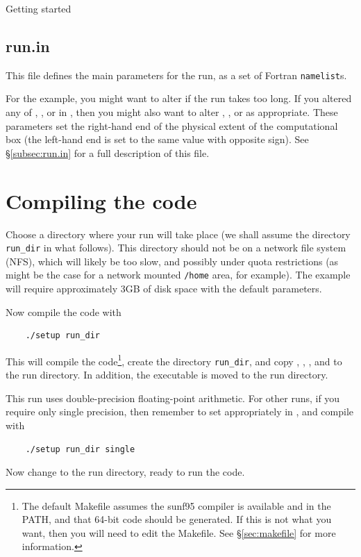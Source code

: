 \begin{chapter}{\label{cha:quickstart}Getting started}
  \subsection{\label{subsec:runin}run.in}
  This file defines the main parameters for the run, as a set of Fortran
  \verb"namelist"s.
  
  For the  example, you might want to alter
   if the run takes too long.  If you altered any of
  , , or  in , then you
  might also want to alter , , or  as
  appropriate.  These parameters set the right-hand end of the physical extent
  of the computational box (the left-hand end is set to the same value with
  opposite sign).  See \S\ref{subsec:run.in} for a full description of this
  file.

  \section{Compiling the code}
  Choose a directory where your run will take place (we shall assume the
  directory \verb"run_dir" in what follows).  This directory should not be on a
  network file system (NFS), which will likely be too slow, and possibly under
  quota restrictions (as might be the case for a network mounted \verb"/home"
  area, for example).  The  example will require approximately
  3GB of disk space with the default parameters.

  Now compile the code with
  \begin{Verbatim}
    ./setup run_dir
  \end{Verbatim}
  This will compile the code\footnote{The default Makefile assumes the sunf95
  compiler is available and in the PATH, and that 64-bit code should be
  generated.  If this is not what you want, then you will need to edit the
  Makefile.  See \S\ref{sec:makefile} for more information.}, create the
  directory \verb"run_dir", and copy , ,
  , and  to the run directory.  In addition,
  the executable  is moved to the run directory.

  This run uses double-precision floating-point arithmetic.  For other runs, if
  you require only single precision, then remember to set 
  appropriately in , and compile with
  \begin{Verbatim}
    ./setup run_dir single
  \end{Verbatim}
  Now change to the run directory, ready to run the code.


\end{chapter}

